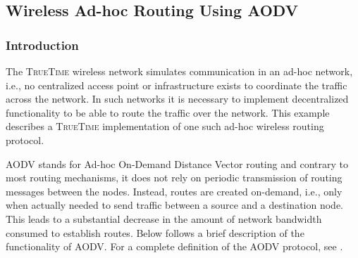 \documentclass[final,twoside]{rapport}
\begin{document}

\subsection{Wireless Ad-hoc Routing Using AODV}
\label{sec:AODV}

\subsubsection{Introduction}
The \textsc{TrueTime} wireless network simulates communication in an
ad-hoc network, i.e., no centralized access point or infrastructure
exists to coordinate the traffic across the network. In such networks
it is necessary to implement decentralized functionality to be able to
route the traffic over the network. This example describes a
\textsc{TrueTime} implementation of one such ad-hoc wireless routing
protocol. 

AODV \cite{per+roy99} stands for Ad-hoc On-Demand Distance Vector
routing and contrary to most routing mechanisms, it does not rely on
periodic transmission of routing messages between the nodes. Instead,
routes are created on-demand, i.e., only when actually needed to send
traffic between a source and a destination node. This leads to a
substantial decrease in the amount of network bandwidth consumed to
establish routes. Below follows a brief description of the
functionality of AODV. For a complete definition of the AODV protocol,
see \cite{AODVrfc}.
\end{document}
